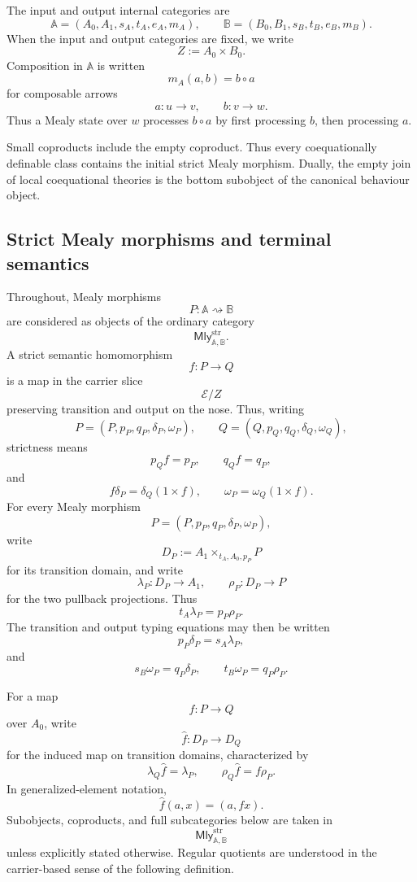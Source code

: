 The input and output internal categories are
\[
    \mathbb A=(A_0,A_1,s_A,t_A,e_A,m_A),
    \qquad
    \mathbb B=(B_0,B_1,s_B,t_B,e_B,m_B).
\]
When the input and output categories are fixed, we write
\[
    Z:=A_0\times B_0.
\]
Composition in \(\mathbb A\) is written
\[
    m_A(a,b)=b\circ a
\]
for composable arrows
\[
    a:u\to v,
    \qquad
    b:v\to w.
\]
Thus a Mealy state over \(w\) processes \(b\circ a\) by first processing \(b\),
then processing \(a\).

Small coproducts include the empty coproduct. Thus every coequationally
definable class contains the initial strict Mealy morphism. Dually, the empty
join of local coequational theories is the bottom subobject of the canonical
behaviour object.

\subsection{Strict Mealy morphisms and terminal semantics}
\label{subsec:coeq-standing-notation-terminal-semantics}

Throughout, Mealy morphisms
\[
    P:\mathbb A\rightsquigarrow\mathbb B
\]
are considered as objects of the ordinary category
\[
    \mathsf{Mly}^{\mathrm{str}}_{\mathbb A,\mathbb B}.
\]
A strict semantic homomorphism
\[
    f:P\to Q
\]
is a map in the carrier slice
\[
    \mathcal E/Z
\]
preserving transition and output on the nose. Thus, writing
\[
    P=(P,p_P,q_P,\delta_P,\omega_P),
    \qquad
    Q=(Q,p_Q,q_Q,\delta_Q,\omega_Q),
\]
strictness means
\[
    p_Qf=p_P,
    \qquad
    q_Qf=q_P,
\]
and
\[
    f\delta_P
    =
    \delta_Q(1\times f),
    \qquad
    \omega_P
    =
    \omega_Q(1\times f).
\]
For every Mealy morphism
\[
    P=(P,p_P,q_P,\delta_P,\omega_P),
\]
write
\[
    D_P
    :=
    A_1\times_{t_A,A_0,p_P}P
\]
for its transition domain, and write
\[
    \lambda_P:D_P\to A_1,
    \qquad
    \rho_P:D_P\to P
\]
for the two pullback projections. Thus
\[
    t_A\lambda_P=p_P\rho_P.
\]
The transition and output typing equations may then be written
\[
    p_P\delta_P=s_A\lambda_P,
\]
and
\[
    s_B\omega_P=q_P\delta_P,
    \qquad
    t_B\omega_P=q_P\rho_P.
\]

For a map
\[
    f:P\to Q
\]
over \(A_0\), write
\[
    \widehat f:
    D_P\to D_Q
\]
for the induced map on transition domains, characterized by
\[
    \lambda_Q\widehat f=\lambda_P,
    \qquad
    \rho_Q\widehat f=f\rho_P.
\]
In generalized-element notation,
\[
    \widehat f(a,x)=(a,fx).
\]
Subobjects, coproducts, and full subcategories below are taken in
\[
    \mathsf{Mly}^{\mathrm{str}}_{\mathbb A,\mathbb B}
\]
unless explicitly stated otherwise. Regular quotients are understood in the
carrier-based sense of the following definition.

